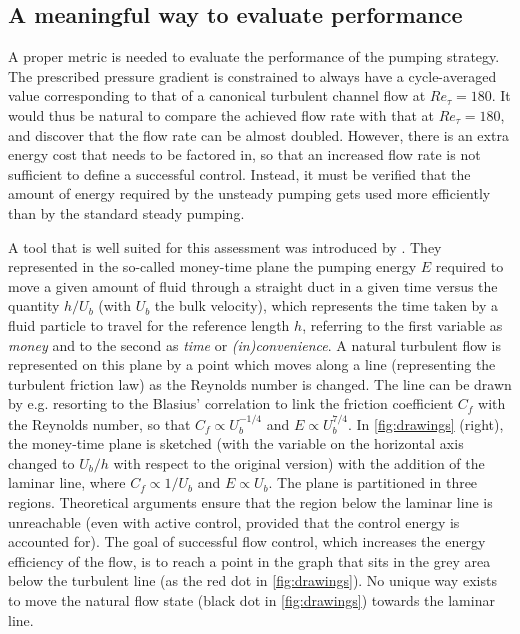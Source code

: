 \documentclass[lineno]{jfm}
\begin{document}
\subsection{A meaningful way to evaluate performance}
\label{sec:moneyversustime}

A proper metric is needed to evaluate the performance of the pumping strategy. 
The prescribed pressure gradient is constrained to always have a cycle-averaged 
value corresponding to that of a canonical turbulent channel flow at 
$Re_\tau=180$. It would thus be natural to compare the achieved flow rate with that at $Re_\tau=180$, and discover that the flow rate can be almost doubled.
However, there is an extra energy cost that needs to be factored in, so that an increased flow rate is not sufficient to define a successful control. Instead, it must be verified that the amount of energy required by the unsteady pumping gets used more efficiently than by the standard steady pumping.

A tool that is well suited for this assessment was introduced by \citet{frohnapfel-hasegawa-quadrio-2012}.
They represented in the so-called money-time plane the pumping energy $E$ 
required to move a given amount of fluid through a straight duct in a given time versus the quantity $h/U_b$ (with $U_b$ the bulk velocity), which represents the time taken by a fluid particle to travel for the reference length $h$, referring to the first variable as \textit{money} and to the second as \textit{time} or \textit{(in)convenience}. 
A natural turbulent flow is represented on this plane by a point which moves along a line (representing the turbulent friction law) as the Reynolds number is changed. 
The line can be drawn by e.g. resorting to the Blasius' correlation \citep{schlichting-1979} to link the friction coefficient $C_f$ with the Reynolds number, so that $C_f \propto U_b ^ {-1/4}$ and $E \propto U_b^{7/4}$. 
In \cref{fig:drawings} (right), the money-time plane is sketched (with the variable on the horizontal axis changed to $U_b/h$ with respect to the original version) with the addition of the laminar line, where $C_f \propto 1/U_b$ and $E \propto U_b$. 
The plane is partitioned in three regions. Theoretical arguments \citep{fukagata-sugiyama-kasagi-2009} ensure that the region below the laminar line is unreachable (even with active control, provided that the control energy is accounted for). 
The goal of successful flow control, which increases the energy efficiency of the flow, is to reach a point in the graph that sits in the grey area below the turbulent line (as the red dot in \cref{fig:drawings}). 
No unique way exists to move the natural flow state (black dot in \cref{fig:drawings}) towards the laminar line. 
\end{document}
